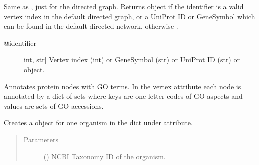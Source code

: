 \documentclass[letterpaper,10pt,english]{sphinxmanual}
\begin{document}
\begin{fulllineitems}
\begin{fulllineitems}
\label{\detokenize{main:pypath.main.PyPath.get_node_d}}
Same as , just for the directed graph.
Returns  object if the identifier
is a valid vertex index in the default directed graph,
or a UniProt ID or GeneSymbol which can be found in the
default directed network, otherwise .
\begin{description}
\item[{@identifier}] \leavevmode{[}int, str{]}
Vertex index (int) or GeneSymbol (str) or UniProt ID (str) or
 object.

\end{description}

\end{fulllineitems}


\begin{fulllineitems}
\label{\detokenize{main:pypath.main.PyPath.get_pathways}}
\end{fulllineitems}


\begin{fulllineitems}
\label{\detokenize{main:pypath.main.PyPath.go_annotate}}
Annotates protein nodes with GO terms. In the  vertex
attribute each node is annotated by a dict of sets where keys are
one letter codes of GO aspects and values are sets of GO accessions.

\end{fulllineitems}


\begin{fulllineitems}
\label{\detokenize{main:pypath.main.PyPath.go_dict}}
Creates a  object for one organism in the
dict under  attribute.
\begin{quote}\begin{description}
\item[{Parameters}] \leavevmode
{} () \textendash{} NCBI Taxonomy ID of the organism.


\end{description}
\end{quote}
\end{fulllineitems}
\end{fulllineitems}
\end{document}
